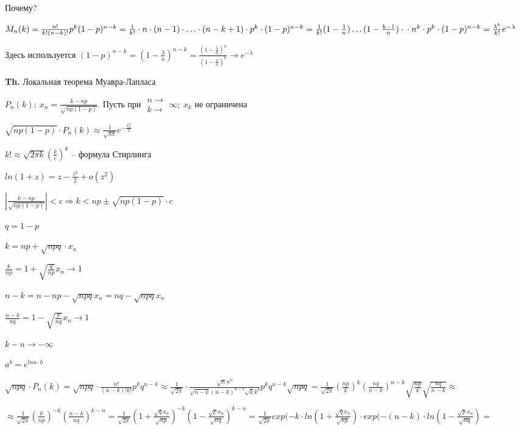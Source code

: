 \documentclass[14pt, letter paper]{article}
\begin{document}
Почему?

$M_n(k) = \frac{n!}{k!(n-k)!} p^k (1-p)^{n-k} = \frac{1}{k!} \cdot n \cdot (n-1) \cdot \ldots \cdot (n-k+1) \cdot p^k \cdot (1-p)^{n-k} = \frac{1}{k!} (1 - \frac{1}{n}) \ldots (1 - \frac{k-1}{n}) \cdot \\ \cdot n^k \cdot p^k \cdot (1-p)^{n-k} = \frac{\lambda^k}{k!} e^{-\lambda}$

Здесь используется $(1-p)^{n-k} = (1 - \frac{\lambda}{n})^{n-k} = \frac{(1 - \frac{\lambda}{n})^n}{(1 - \frac{\lambda}{n})^k} \rightarrow e^{-\lambda}$

\vspace{5mm}

\textbf{Th.} Локальная теорема Муавра-Лапласа

$P_n(k);\ x_n = \frac{k -np}{\sqrt{np(1-p)}}$. Пусть при $\begin{gathered}
    n \rightarrow \\
    k \rightarrow
\end{gathered} \infty;\ x_k$ не ограничена

$\sqrt{np(1-p)} \cdot P_n(k) \approx \frac{1}{\sqrt{\lambda \pi}} e^{-\frac{x_n^2}{2}}$

$k! \approx \sqrt{2\pi k} (\frac{k}{e})^k$ -- формула Стирлинга

$ln(1+z) = z - \frac{z^2}{2} + o(z^2)$

$|\frac{k-np}{\sqrt{np(1-p)}}| < c \Rightarrow k < np \pm \sqrt{np(1-p)} \cdot c$

$q = 1 - p$

$k = np + \sqrt{npq} \cdot x_n$

$\frac{k}{np} = 1 + \sqrt{\frac{q}{np}} x_n \rightarrow 1$

$n-k = n - np - \sqrt{npq} x_n = nq - \sqrt{npq} x_n$

$\frac{n-k}{nq} = 1 - \sqrt{\frac{p}{nq}} x_n \rightarrow 1$

$k - n \rightarrow - \infty$

$a^b = e^{lna \cdot b}$

$\sqrt{npq} \cdot P_n(k) = \sqrt{npq} \cdot \frac{n!}{(n-k)!k!}p^kq^{n-k} \approx \frac{1}{\sqrt{2\pi}} \cdot \frac{\sqrt{n}n^n}{\sqrt{n-k}(n-k)^{n-k}\sqrt{k}k^k} p^k q^{n-k} \sqrt{npq} = \frac{1}{\sqrt{2\pi}} (\frac{np}{k})^k(\frac{nq}{n-k})^{n-k}\sqrt{\frac{np}{k}}\sqrt{\frac{nq}{n-k}} \approx$

$\approx \frac{1}{\sqrt{2\pi}} (\frac{k}{np})^{-k}(\frac{n-k}{nq})^{k-n} = \frac{1}{\sqrt{2\pi}} (1 + \frac{\sqrt{q}x_n}{\sqrt{np}})^{-k}(1 - \frac{\sqrt{p}x_n}{\sqrt{nq}})^{k-n} = \frac{1}{\sqrt{2\pi}} exp(-k \cdot ln(1 + \frac{\sqrt{q}x_n}{\sqrt{np}}) \cdot exp(-(n-k) \cdot ln(1 - \frac{\sqrt{p}x_n}{\sqrt{nq}}) =$
\end{document}
